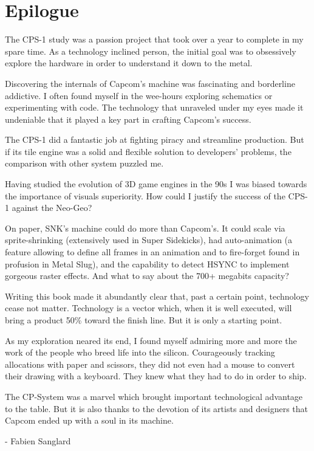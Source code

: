 \chapter{Epilogue} 

The CPS-1 study was a passion project that took over a year to complete in my spare time. As a technology inclined person, the initial goal was to obsessively explore the hardware in order to understand it down to the metal.

Discovering the internals of Capcom's machine was fascinating and borderline addictive. I often found myself in the wee-hours exploring schematics or experimenting with code. The technology that unraveled under my eyes made it undeniable that it played a key part in crafting Capcom's success. 

The CPS-1 did a fantastic job at fighting piracy and streamline production. But if its tile engine was a solid and flexible solution to developers' problems, the comparison with other system puzzled me.

Having studied the evolution of 3D game engines in the 90s I was biased towards the importance of visuals superiority. How could I justify the success of the CPS-1 against the Neo-Geo? 

On paper, SNK's machine could do more than Capcom's. It could scale via sprite-shrinking (extensively used in Super Sidekicks),
had auto-animation (a feature allowing to define all frames in an animation and to fire-forget found in profusion in Metal Slug), and the capability to detect HSYNC to implement gorgeous raster effects. And what to say about the 700+ megabits capacity?

Writing this book made it abundantly clear that, past a certain point, technology cease not matter. Technology is a vector which, when it is well executed, will bring a product 50\% toward the finish line. But it is only a starting point.

As my exploration neared its end, I found myself admiring more and more the work of the people who breed life into the silicon.   
Courageously tracking allocations with paper and scissors, they did not even had a mouse to convert their drawing with a keyboard. They knew what they had to do in order to ship.

The CP-System was a marvel which brought important technological advantage to the table. But it is also thanks to the devotion of its artists and designers that Capcom ended up with a soul in its machine.

- Fabien Sanglard
